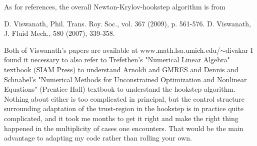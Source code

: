 \begin{description}
As for references, the overall Newton-Krylov-hookstep algorithm is from

D. Viswanath, Phil. Trans. Roy. Soc., vol. 367 (2009), p. 561-576.
D. Viswanath, J. Fluid Mech., 580 (2007), 339-358.

Both of Viswanath's papers are available at
{www.math.lsa.umich.edu/$\sim$divakar} I found it necessary to also
refer to Trefethen's "Numerical Linear Algebra" textbook (SIAM Press)
to understand Arnoldi and GMRES and Dennis and Schnabel's "Numerical
Methods for Unconstrained Optimization and Nonlinear Equations"
(Prentice Hall) textbook to understand the hookstep algorithm. Nothing
about either is too complicated in principal, but the control
structure surrounding adaptation of the trust-region in the hookstep
is in practice quite complicated, and it took me months to get it
right and make the right thing happened in the multiplicity of cases
one encounters. That would be the main advantage to adapting my code
rather than rolling your own.

\end{description}
